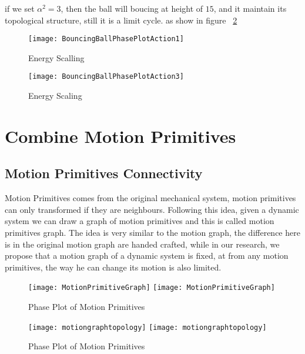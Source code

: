 if we set $\alpha^2=3$, then the ball will boucing at height of $15$, and it maintain its topological structure, still it is a limit cycle.
as show in figure ~\ref{fig:energy3} 


\begin{figure}[!htbp]
  \begin{center}
      \texttt{[image: BouncingBallPhasePlotAction1]}
    \caption{Energy Scalling}
    \label{fig:energy1}
  \end{center}
\end{figure} 


\begin{figure}[!htbp]
  \begin{center}

      \texttt{[image: BouncingBallPhasePlotAction3]}
    \caption{Energy Scaling}
    \label{fig:energy3}
  \end{center}
\end{figure}

\section{Combine Motion Primitives}

\subsection{Motion Primitives Connectivity}
Motion Primitives comes from the original mechanical system, motion primitives can only transformed if they are neighbours.
Following this idea, given a dynamic system we can draw a graph of motion primitives and this is called motion primitives graph.
The idea is very similar to the motion graph, the difference here is in the original motion graph are handed  crafted, 
while in our research, we propose that a motion graph of a dynamic system is fixed, at from any motion primitives, the way he can change its motion is also limited.

\begin{figure}[!htbp]
  \begin{center}
    \leavevmode
    \ifpdf
      \texttt{[image: MotionPrimitiveGraph]}
    \else
      \texttt{[image: MotionPrimitiveGraph]}
    \fi
    \caption{Phase Plot of Motion Primitives}
    \label{fig:manyprimitives}
  \end{center}
\end{figure}


\begin{figure}[!htbp]
  \begin{center}
    \leavevmode
    \ifpdf
      \texttt{[image: motiongraphtopology]}
    \else
      \texttt{[image: motiongraphtopology]}
    \fi
    \caption{Phase Plot of Motion Primitives}
    \label{fig:manyprimitives}
  \end{center}
\end{figure}


